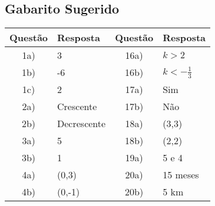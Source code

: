 \documentclass[11pt]{article}
\begin{document}
\begin{multicols}{2}
\subsection*{Gabarito Sugerido}
\begin{tabular}{|c|l|c|l|}
\hline
\textbf{Questão} & \textbf{Resposta} & \textbf{Questão} & \textbf{Resposta} \\
\hline
1a) & 3 & 16a) & \( k>2 \) \\
1b) & -6 & 16b) & \( k<-\frac{1}{3} \) \\
1c) & 2 & 17a) & Sim \\
2a) & Crescente & 17b) & Não \\
2b) & Decrescente & 18a) & (3,3) \\
3a) & 5 & 18b) & (2,2) \\
3b) & 1 & 19a) & 5 e 4 \\
4a) & (0,3) & 20a) & 15 meses \\
4b) & (0,-1) & 20b) & 5 km \\
\hline
\end{tabular}

\end{multicols}
\end{document}
